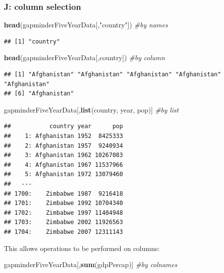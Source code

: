 \documentclass[]{article}
\newenvironment{Shaded}{\begin{snugshade}}{\end{snugshade}}
\newcommand{\KeywordTok}[1]{\textcolor[rgb]{0.13,0.29,0.53}{\textbf{{#1}}}}
\newcommand{\StringTok}[1]{\textcolor[rgb]{0.31,0.60,0.02}{{#1}}}
\newcommand{\CommentTok}[1]{\textcolor[rgb]{0.56,0.35,0.01}{\textit{{#1}}}}
\newcommand{\NormalTok}[1]{{#1}}
\begin{document}
\subsubsection{J: column selection}\label{j-column-selection}

\begin{Shaded}
\begin{Highlighting}[]
\KeywordTok{head}\NormalTok{(gapminderFiveYearData[,}\StringTok{"country"}\NormalTok{]) }\CommentTok{#by names}
\end{Highlighting}
\end{Shaded}

\begin{verbatim}
## [1] "country"
\end{verbatim}

\begin{Shaded}
\begin{Highlighting}[]
\KeywordTok{head}\NormalTok{(gapminderFiveYearData[,country]) }\CommentTok{#by column}
\end{Highlighting}
\end{Shaded}

\begin{verbatim}
## [1] "Afghanistan" "Afghanistan" "Afghanistan" "Afghanistan" "Afghanistan"
## [6] "Afghanistan"
\end{verbatim}

\begin{Shaded}
\begin{Highlighting}[]
\NormalTok{gapminderFiveYearData[,}\KeywordTok{list}\NormalTok{(country, year, pop)] }\CommentTok{#by list}
\end{Highlighting}
\end{Shaded}

\begin{verbatim}
##           country year      pop
##    1: Afghanistan 1952  8425333
##    2: Afghanistan 1957  9240934
##    3: Afghanistan 1962 10267083
##    4: Afghanistan 1967 11537966
##    5: Afghanistan 1972 13079460
##   ---                          
## 1700:    Zimbabwe 1987  9216418
## 1701:    Zimbabwe 1992 10704340
## 1702:    Zimbabwe 1997 11404948
## 1703:    Zimbabwe 2002 11926563
## 1704:    Zimbabwe 2007 12311143
\end{verbatim}

This allows operations to be performed on columns:

\begin{Shaded}
\begin{Highlighting}[]
\NormalTok{gapminderFiveYearData[,}\KeywordTok{sum}\NormalTok{(gdpPercap)] }\CommentTok{#by colnames}
\end{Highlighting}
\end{Shaded}
\end{document}
